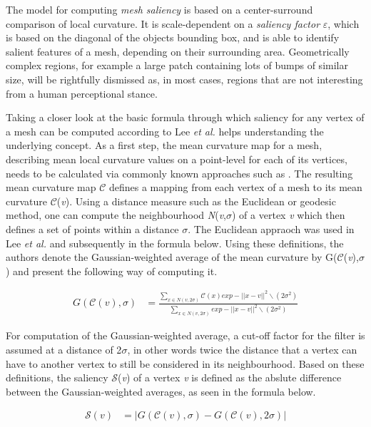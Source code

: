 The model for computing \textit{mesh saliency} is based on a center-surround comparison of local curvature. It is scale-dependent on a \textit{saliency factor} $\varepsilon$, which is based on the diagonal of the objects bounding box, and is able to identify salient features of a mesh, depending on their surrounding area. Geometrically complex regions, for example a large patch containing lots of bumps of similar size, will be rightfully dismissed as, in most cases, regions that are not interesting from a human perceptional stance.

Taking a closer look at the basic formula through which saliency for any vertex of a mesh can be computed according to Lee \textit{et al.} helps understanding the underlying concept. As a first step, the mean curvature map for a mesh, describing mean local curvature values on a point-level for each of its vertices, needs to be calculated via commonly known approaches such as \cite{taubin1995estimating}. The resulting mean curvature map $\mathscr{C}$ defines a mapping from each vertex of a mesh to its mean curvature $\mathscr{C}$(\textit{v}). Using a distance measure such as the Euclidean or geodesic method, one can compute the neighbourhood \textit{N}(\textit{v},$\sigma$) of a vertex \textit{v} which then defines a set of points within a distance $\sigma$. The Euclidean appraoch was used in Lee \textit{et al.} and subsequently in the formula below.
Using these definitions, the authors denote the Gaussian-weighted average of the mean curvature by G($\mathscr{C}$(\textit{v}),$\sigma$) and present the following way of computing it.

\begin{align*}
G(\mathscr{C}(v),\sigma) &= \frac
	{
		\sum_{x \in N(v,2\sigma)}
			\mathscr{C}(x)exp	-||x-v||^2 \backslash(2\sigma^2)
	}{
		\sum_{x \in N(v,2\sigma)}
			exp -||x-v||^2 \backslash(2\sigma^2)
	}
\end{align*}

For computation of the Gaussian-weighted average, a cut-off factor for the filter is assumed at a distance of 2$\sigma$, in other words twice the distance that a vertex can have to another vertex to still be considered in its neighbourhood.
Based on these definitions, the saliency $\mathscr{S}$(\textit{v}) of a vertex \textit{v} is defined as the abslute difference between the Gaussian-weighted averages, as seen in the formula below.

\begin{align*}
\mathscr{S}(\textit{v}) &= |\textit{G}(\mathscr{C}(\textit{v}),\sigma) - G(\mathscr{C}(\textit{v}),2\sigma)|
\end{align*}

